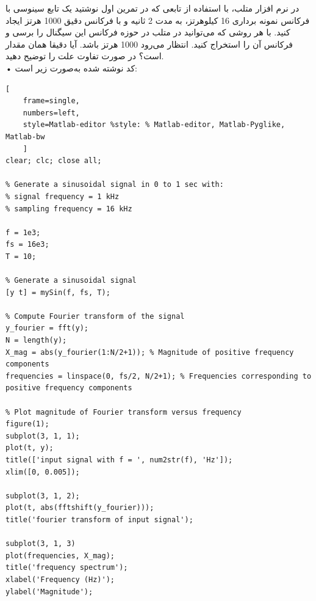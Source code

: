 \documentclass[12pt]{exam}
\newcommand{\class}{آزمایشگاه DSP}
\begin{document}

\pagestyle{empty}


\pagestyle{head}
\firstpageheader{}{}{}
\runningheader{صفحه \thepage\ از \numpages}{}{\class}
\runningheadrule

\vspace{0pt}




\begin{questions}

\question
در نرم افزار متلب، با استفاده از تابعی که در تمرین اول نوشتید یک تابع سینوسی با فرکانس نمونه برداری 16 کیلوهرتز، به مدت 2 ثانیه و با فرکانس دقیق 1000 هرتز ایجاد کنید. با هر روشی که می‌توانید در متلب در حوزه فرکانس این سیگنال را برسی و فرکانس آن را استخراج کنید. انتظار می‌رود 1000 هرتز باشد. آیا دقیقا همان مقدار است؟ در صورت تفاوت علت را توضیح دهید. \\

• کد نوشته شده به‌صورت زیر است: \\
\begin{latin}
\begin{lstlisting}[
	frame=single,
	numbers=left,
	style=Matlab-editor %style: % Matlab-editor, Matlab-Pyglike, Matlab-bw
	] 
clear; clc; close all;

% Generate a sinusoidal signal in 0 to 1 sec with:
% signal frequency = 1 kHz
% sampling frequency = 16 kHz

f = 1e3;
fs = 16e3;
T = 10;

% Generate a sinusoidal signal
[y t] = mySin(f, fs, T);

% Compute Fourier transform of the signal
y_fourier = fft(y);
N = length(y);
X_mag = abs(y_fourier(1:N/2+1)); % Magnitude of positive frequency components
frequencies = linspace(0, fs/2, N/2+1); % Frequencies corresponding to positive frequency components

% Plot magnitude of Fourier transform versus frequency
figure(1);
subplot(3, 1, 1);
plot(t, y);
title(['input signal with f = ', num2str(f), 'Hz']);
xlim([0, 0.005]);

subplot(3, 1, 2);
plot(t, abs(fftshift(y_fourier)));
title('fourier transform of input signal');

subplot(3, 1, 3)
plot(frequencies, X_mag);
title('frequency spectrum');
xlabel('Frequency (Hz)');
ylabel('Magnitude');

\end{lstlisting}
\end{latin}


\end{questions}
\end{document}
